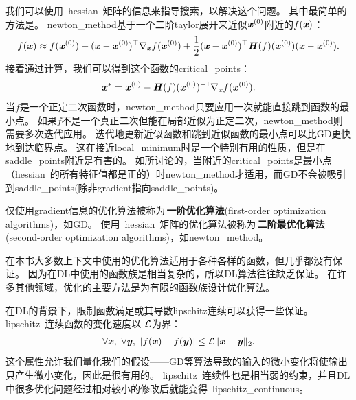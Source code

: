 我们可以使用~\gls{hessian}~矩阵的信息来指导搜索，以解决这个问题。
其中最简单的方法是。
\gls{newton_method}基于一个二阶\gls{taylor}展开来近似$\boldsymbol{\mathit{x}}^{(0)}$附近的$f(\boldsymbol{\mathit{x}})$：
\begin{align}
 f(\boldsymbol{\mathit{x}}) \approx f(\boldsymbol{\mathit{x}}^{(0)}) + (\boldsymbol{\mathit{x}} - \boldsymbol{\mathit{x}}^{(0)})^\top \nabla_{\boldsymbol{\mathit{x}}} f(\boldsymbol{\mathit{x}}^{(0)}) + 
 \frac{1}{2}  (\boldsymbol{\mathit{x}} - \boldsymbol{\mathit{x}}^{(0)})^\top \boldsymbol{\mathit{H}}(f)(\boldsymbol{\mathit{x}}^{(0)})  (\boldsymbol{\mathit{x}} - \boldsymbol{\mathit{x}}^{(0)}).
\end{align}
接着通过计算，我们可以得到这个函数的\gls{critical_points}：
\begin{align} \label{eq:newtonstep}
 \boldsymbol{\mathit{x}}^* =  \boldsymbol{\mathit{x}}^{(0)} -  \boldsymbol{\mathit{H}}(f)(\boldsymbol{\mathit{x}}^{(0)})^{-1}  \nabla_{\boldsymbol{\mathit{x}}} f(\boldsymbol{\mathit{x}}^{(0)}) .
\end{align}
当$f$是一个正定二次函数时，\gls{newton_method}只要应用一次就能直接跳到函数的最小点。
如果$f$不是一个真正二次但能在局部近似为正定二次，\gls{newton_method}则需要多次迭代应用。
迭代地更新近似函数和跳到近似函数的最小点可以比\gls{GD}更快地到达临界点。
这在接近\gls{local_minimum}时是一个特别有用的性质，但是在\gls{saddle_points}附近是有害的。
如所讨论的，当附近的\gls{critical_points}是最小点（\gls{hessian}~的所有特征值都是正的）时\gls{newton_method}才适用，而\gls{GD}不会被吸引到\gls{saddle_points}(除非\gls{gradient}指向\gls{saddle_points})。

仅使用\gls{gradient}信息的优化算法被称为\,\textbf{一阶优化算法}(first-order optimization algorithms)，如\gls{GD}。
使用~\gls{hessian}~矩阵的优化算法被称为\,\textbf{二阶最优化算法}(second-order optimization algorithms)\citep{NumOptBook}，如\gls{newton_method}。

在本书大多数上下文中使用的优化算法适用于各种各样的函数，但几乎都没有保证。
因为在\gls{DL}中使用的函数族是相当复杂的，所以\gls{DL}算法往往缺乏保证。
在许多其他领域，优化的主要方法是为有限的函数族设计优化算法。

在\gls{DL}的背景下，限制函数满足或其导数\gls{lipschitz}连续可以获得一些保证。
\gls{lipschitz}~连续函数的变化速度以 $\mathcal{L}$为界：
\begin{align}
 \forall \boldsymbol{\mathit{x}},~\forall \boldsymbol{\mathit{y}}, ~| f(\boldsymbol{\mathit{x}}) - f(\boldsymbol{\mathit{y}})|  \leq \mathcal{L} \| \boldsymbol{\mathit{x}} - \boldsymbol{\mathit{y}} \|_2 .
\end{align}
这个属性允许我们量化我们的假设——\gls{GD}等算法导致的输入的微小变化将使输出只产生微小变化，因此是很有用的。
\gls{lipschitz}~连续性也是相当弱的约束，并且\gls{DL}中很多优化问题经过相对较小的修改后就能变得~\gls{lipschitz_continuous}。

